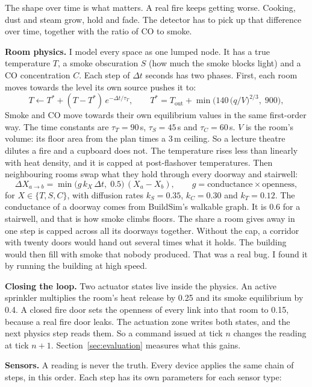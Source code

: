 The shape over time is what matters. A real fire keeps getting worse. Cooking, dust
and steam grow, hold and fade. The detector has to pick up that difference over
time, together with the ratio of CO to smoke.

\textbf{Room physics.} I model every space as one lumped node. It has a true
temperature $T$, a smoke obscuration $S$ (how much the smoke blocks light) and a CO
concentration $C$. Each step of $\Delta t$ seconds has two phases. First, each room
moves towards the level its own source pushes it to:
\[
  T \leftarrow T^{\ast} + (T - T^{\ast})\,e^{-\Delta t/\tau_T}, \qquad
  T^{\ast} = T_{\text{out}} + \min\!\Big(140\,\big(q/V\big)^{2/3},\; 900\Big),
\]
Smoke and CO move towards their own equilibrium values in the same first-order way.
The time constants are $\tau_T = 90$\,s, $\tau_S = 45$\,s and $\tau_C = 60$\,s.
$V$ is the room's volume: its floor area from the plan times a 3\,m ceiling. So a
lecture theatre dilutes a fire and a cupboard does not. The temperature rises less
than linearly with heat density, and it is capped at post-flashover temperatures.
Then neighbouring rooms swap what they hold through every doorway and stairwell:
\[
  \Delta X_{a \to b} = \min\!\big(g\,k_X\,\Delta t,\; 0.5\big)\,(X_a - X_b),
  \qquad g = \text{conductance} \times \text{openness},
\]
for $X \in \{T, S, C\}$, with diffusion rates $k_S = 0.35$, $k_C = 0.30$ and
$k_T = 0.12$. The conductance of a doorway comes from BuildSim's walkable graph. It
is 0.6 for a stairwell, and that is how smoke climbs floors. The share a room gives
away in one step is capped across all its doorways together. Without the cap, a
corridor with twenty doors would hand out several times what it holds. The building
would then fill with smoke that nobody produced. That was a real bug. I found it by
running the building at high speed.

\textbf{Closing the loop.} Two actuator states live inside the physics. An active
sprinkler multiplies the room's heat release by 0.25 and its smoke equilibrium by
0.4. A closed fire door sets the openness of every link into that room to 0.15,
because a real fire door leaks. The actuation zone writes both states, and the next
physics step reads them. So a command issued at tick $n$ changes the reading at tick
$n+1$. Section~\ref{sec:evaluation} measures what this gains.

\textbf{Sensors.} A reading is never the truth. Every device applies the same
chain of steps, in this order. Each step has its own parameters for each sensor
type:

